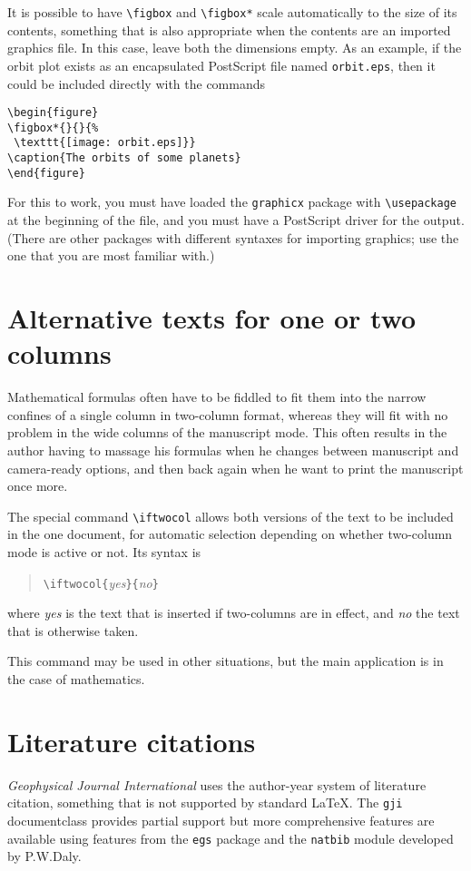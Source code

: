 \documentclass[extra,mreferee]{gji}
\begin{document}
It is possible to have \verb!\figbox! and \verb!\figbox*! scale automatically
to the size of its contents, something that is also appropriate when the
contents are an imported graphics file. In this case, leave both the
dimensions empty. As an example, if the orbit plot exists as an encapsulated
PostScript file named \texttt{orbit.eps}, then it could be included directly
with the commands
\begin{verbatim}
\begin{figure}
\figbox*{}{}{%
 \texttt{[image: orbit.eps]}}
\caption{The orbits of some planets}
\end{figure}
\end{verbatim}
For this to work, you must have loaded the \texttt{graphicx} package with
\verb!\usepackage! at the beginning of the file, and you must have a
PostScript driver for the output. (There are other packages with
different syntaxes for importing graphics; use the one that you are
most familiar with.)


\section{Alternative texts for one or two columns}
Mathematical formulas often have to be fiddled to fit them into the
narrow confines of a single column in two-column format, whereas they
will fit with no problem in the wide columns of the manuscript mode.
This often results in the author having to massage his formulas when he
changes between manuscript and camera-ready options, and then back again
when he want to print the manuscript once more.

The special command \verb!\iftwocol! allows both versions of the text to
be included in the one document, for automatic selection depending on
whether two-column mode is active or not. Its syntax is\label{iftwocol}
\begin{quote}
\normalsize
\verb!\iftwocol{!{\em yes\/}\verb!}{!{\em no\/}\verb!}!
\end{quote}
where {\em yes\/} is the text that is inserted if two-columns are in
effect, and {\em no\/} the text that is otherwise taken.

This command may be used in other situations, but the main application
is in the case of mathematics.

\section{Literature citations}
\textit{Geophysical Journal International} uses the
author-year system of literature citation, something that is not
supported by standard \LaTeX. The \verb"gji" documentclass
provides partial support but more comprehensive features are
available using features from the \verb"egs" package and the
\verb"natbib" module developed by P.W.Daly.
\end{document}
